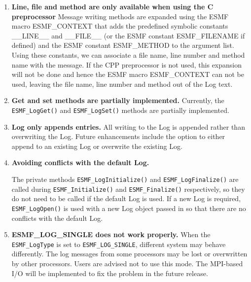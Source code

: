 %

\begin{enumerate}

\item {\bf Line, file and method are only available when using the C 
preprocessor}
Message writing methods are expanded using the ESMF macro ESMF\_CONTEXT 
that adds the predefined symbolic constants \_\_LINE\_\_ and \_\_FILE\_\_ (or 
the ESMF constant ESMF\_FILENAME if defined) and the ESMF constant ESMF\_METHOD 
to the argument list.  Using these constants, we can associate a file name, 
line number and method name with the message.  If the CPP preprocessor is not 
used, this expansion will not be done and hence the ESMF macro ESMF\_CONTEXT 
can not be used, leaving the file name, line number and method out of the Log 
text.

\item{\bf Get and set methods are partially implemented.}
Currently, the {\tt ESMF\_LogGet()} and {\tt ESMF\_LogSet()} methods are 
partially implemented.   

\item{\bf Log only appends entries.}
All writing to the Log is appended rather than overwriting the Log.  Future 
enhancements include the option to either append to an existing Log or 
overwrite the existing Log.

\item{\bf Avoiding conflicts with the default Log.}
\begin{sloppypar}
The private methods {\tt ESMF\_LogInitialize()} and {\tt ESMF\_LogFinalize()} 
are called during {\tt ESMF\_Initialize()} and {\tt ESMF\_Finalize()} 
respectively, so they do not need to be called if the default Log is used. 
If a new Log is required, {\tt ESMF\_LogOpen()} is used with a new Log object 
passed in so that there are no conflicts with the default Log.
\end{sloppypar}

\item{\bf ESMF\_LOG\_SINGLE does not work properly.}
When the {\tt ESMF\_LogType} is set to {\tt ESMF\_LOG\_SINGLE}, different system may behave
differently.  The log messages from some processors may be lost or overwritten
by other processors.  Users are advised not to use this mode.  The MPI-based
I/O will be implemented to fix the problem in the future release. 


\end{enumerate}
